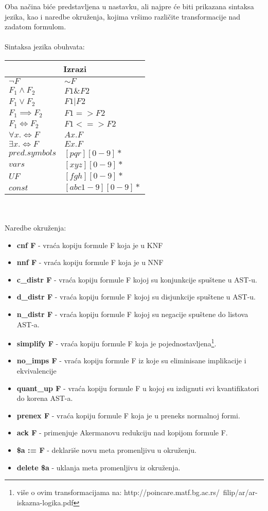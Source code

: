 \documentclass[a4paper]{article}
\begin{document}
Oba načina biće predstavljena u nastavku, ali najpre će biti prikazana sintaksa jezika, kao i naredbe okruženja, kojima vršimo različite transformacije nad zadatom formulom.\\\\
Sintaksa jezika obuhvata:\\
\begin{tabular}{ |l|l| }
	\hline
	\multicolumn{2}{|c|}{Izrazi} \\
	\hline
	$\lnot F$ & $\sim F$ \\
	$F_1 \land F_2$ & $F1 \& F2$ \\
	$F_1 \lor F_2$ & $F1 | F2$ \\
	$F_1 \implies F_2$ & $F1 => F2$ \\
	$F_1 \Leftrightarrow F_2$ & $F1 <=> F2$ \\
	$\forall x. \Leftrightarrow F$ & $Ax. F$ \\
	$\exists x. \Leftrightarrow F$ & $Ex. F$ \\
	$pred. symbols$ & $[pqr][0-9]*$ \\
	$vars$ & $[xyz][0-9]*$ \\
	$UF$ & $[fgh][0-9]*$ \\
	$const$ & $[abc1-9][0-9]*$ \\
	\hline
\end{tabular}
\\\\
Naredbe okruženja:
\begin{itemize}
	\item \textbf{cnf F} - vraća kopiju formule F koja je u KNF
	\item \textbf{nnf F} - vraća kopiju formule F koja je u NNF
	\item \textbf{c\_distr F} - vraća kopiju formule F kojoj su konjunkcije spuštene u AST-u.
	\item \textbf{d\_distr F} - vraća kopiju formule F kojoj su disjunkcije spuštene u AST-u.
	\item \textbf{n\_distr F} - vraća kopiju formule F kojoj su negacije spuštene do listova AST-a.
	\item \textbf{simplify F} - vraća kopiju formule F koja je pojednostavljena\footnote{više o ovim transformacijama na: http://poincare.matf.bg.ac.rs/~filip/ar/ar-iskazna-logika.pdf}.
	\item \textbf{no\_imps F} - vraća kopiju formule F iz koje su eliminisane implikacije i ekvivalencije
	\item \textbf{quant\_up F} - vraća kopiju formule F u kojoj su izdignuti svi kvantifikatori do korena AST-a.
	\item \textbf{prenex F} - vraća kopiju formule F koja je u preneks normalnoj formi.
	\item \textbf{ack F} - primenjuje Akermanovu redukciju nad kopijom formule F.
	\item \textbf{\$a := F} - deklariše novu meta promenljivu u okruženju.
	\item \textbf{delete \$a} - uklanja meta promenljivu iz okruženja.
\end{itemize}
\end{document}

